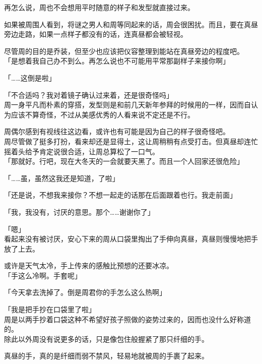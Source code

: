 再怎么说，周也不会想用平时随意的样子和发型就直接过来。

如果被周围人看到，将谜之男人和周等同起来的话，周会很困扰。而且，要在真昼旁边走路，如果一点样子都没有的话，连真昼都会被轻视。

尽管周的目的是乔装，但至少也应该把仪容整理到能站在真昼旁边的程度吧。\\

「是想着我自己办不到么。再怎么说也不可能用平常那副样子来接你啊」

「……这倒是啦」

「不合适吗？我对着镜子确认过来着，还是很奇怪吗」\\

周一身平凡而朴素的穿搭，发型则是和前几天新年参拜的时候用的一样，因而自认为应该不算奇怪，不过从美感优秀的人看来说不定还是不行。

周偶尔感到有视线往这边看，或许也有可能是因为自己的样子很奇怪吧。\\

周尽管做了挺多打扮，看来却还是显得土，这让周稍稍有点受打击。但真昼却连忙摇着头给予肯定说很合适，让周总算松了一口气。\\

「那就好。行吧，现在大冬天的一会就要天黑了。而且一个人回家还很危险」

「……虽，虽然这我还是知道，了啦」

「还是说，不想我来接你？不想一起走的话那在后面跟着也行。我走前面」

「我，我没有，讨厌的意思。那个……谢谢你了」

「嗯」\\

看起来没有被讨厌，安心下来的周从口袋里掏出了手伸向真昼，真昼则慢慢地把手放了上去。

或许是天气太冷，手上传来的感触比预想的还要冰凉。\\

「手这么冷啊。手套呢」

「今天拿去洗掉了。倒是周君你的手怎么这么热啊」

「我是把手抄在口袋里了啦」\\

周是以两手抄着口袋这种不希望好孩子照做的姿势过来的，因而也没什么好称道的。\\

除此以外周没有说更多的话，只是像包住般握紧了那只纤细的手。

真昼的手，真的是纤细而弱不禁风，轻易地就被周的手裹了起来。\\

